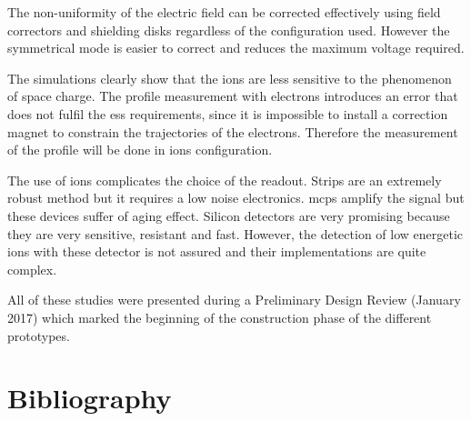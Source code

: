 \begin{refsection}
  The non-uniformity of the electric field can be corrected effectively using field correctors and shielding disks regardless of the configuration used. However the symmetrical mode is easier to correct and reduces the maximum voltage required.

  The simulations clearly show that the ions are less sensitive to the phenomenon of space charge. The profile measurement with electrons introduces an error that does not fulfil the \acrshort{ess} requirements, since it is impossible to install a correction magnet to constrain the trajectories of the electrons. Therefore the measurement of the profile will be done in ions configuration.

  The use of ions complicates the choice of the readout. Strips are an extremely robust method but it requires a low noise electronics. \acrshort{mcp}s amplify the signal but these devices suffer of aging effect. Silicon detectors are very promising because they are very sensitive, resistant and fast. However, the detection of low energetic ions with these detector is not assured and their implementations are quite complex.

  All of these studies were presented during a Preliminary Design Review (January 2017) which marked the beginning of the construction phase of the different prototypes.

  \cleardoublepage
  \section*{Bibliography}
  \label{ch3:bib}
  \printbibliography[heading=subbibliography]

\end{refsection}

